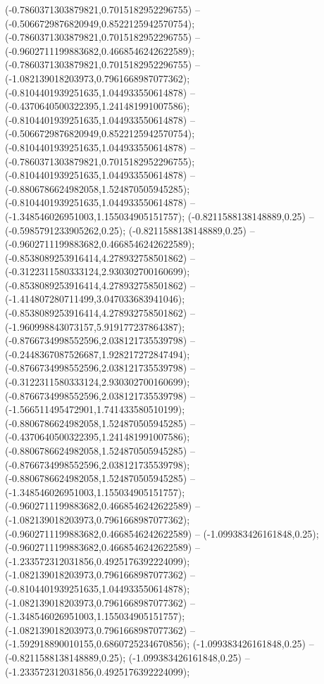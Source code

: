  (-0.7860371303879821,0.7015182952296755) -- (-0.5066729876820949,0.8522125942570754);
 (-0.7860371303879821,0.7015182952296755) -- (-0.9602711199883682,0.4668546242622589);
 (-0.7860371303879821,0.7015182952296755) -- (-1.082139018203973,0.7961668987077362);
 (-0.8104401939251635,1.044933550614878) -- (-0.4370640500322395,1.241481991007586);
 (-0.8104401939251635,1.044933550614878) -- (-0.5066729876820949,0.8522125942570754);
 (-0.8104401939251635,1.044933550614878) -- (-0.7860371303879821,0.7015182952296755);
 (-0.8104401939251635,1.044933550614878) -- (-0.8806786624982058,1.524870505945285);
 (-0.8104401939251635,1.044933550614878) -- (-1.348546026951003,1.155034905151757);
 (-0.8211588138148889,0.25) -- (-0.5985791233905262,0.25);
 (-0.8211588138148889,0.25) -- (-0.9602711199883682,0.4668546242622589);
 (-0.8538089253916414,4.278932758501862) -- (-0.3122311580333124,2.930302700160699);
 (-0.8538089253916414,4.278932758501862) -- (-1.414807280711499,3.047033683941046);
 (-0.8538089253916414,4.278932758501862) -- (-1.960998843073157,5.919177237864387);
 (-0.8766734998552596,2.038121735539798) -- (-0.2448367087526687,1.928217272847494);
 (-0.8766734998552596,2.038121735539798) -- (-0.3122311580333124,2.930302700160699);
 (-0.8766734998552596,2.038121735539798) -- (-1.566511495472901,1.741433580510199);
 (-0.8806786624982058,1.524870505945285) -- (-0.4370640500322395,1.241481991007586);
 (-0.8806786624982058,1.524870505945285) -- (-0.8766734998552596,2.038121735539798);
 (-0.8806786624982058,1.524870505945285) -- (-1.348546026951003,1.155034905151757);
 (-0.9602711199883682,0.4668546242622589) -- (-1.082139018203973,0.7961668987077362);
 (-0.9602711199883682,0.4668546242622589) -- (-1.099383426161848,0.25);
 (-0.9602711199883682,0.4668546242622589) -- (-1.233572312031856,0.4925176392224099);
 (-1.082139018203973,0.7961668987077362) -- (-0.8104401939251635,1.044933550614878);
 (-1.082139018203973,0.7961668987077362) -- (-1.348546026951003,1.155034905151757);
 (-1.082139018203973,0.7961668987077362) -- (-1.592918890010155,0.6860725234670856);
 (-1.099383426161848,0.25) -- (-0.8211588138148889,0.25);
 (-1.099383426161848,0.25) -- (-1.233572312031856,0.4925176392224099);
